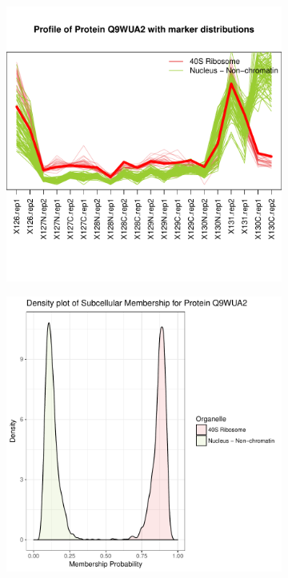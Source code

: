 \documentclass[12pt,english]{article}
\begin{document}
\begin{figure}[h]
\begin{subfigure}[t]{0.5\textwidth}
\includegraphics{tagm-020}
    \caption{}
  \end{subfigure}
  \vspace{1cm}
  \begin{subfigure}[t]{0.5\textwidth}
    \centering
\includegraphics{tagm-021}

\end{subfigure}
\end{figure}
\end{document}

